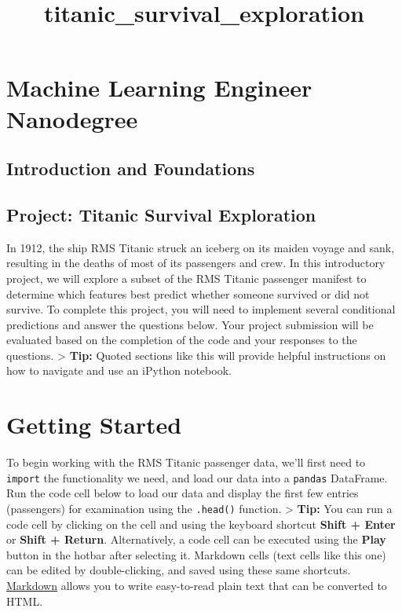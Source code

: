 \documentclass[11pt]{article}
\title{titanic\_survival\_exploration}
\begin{document}
    
    
    \maketitle
    
    

    
    \hypertarget{machine-learning-engineer-nanodegree}{%
\section{Machine Learning Engineer
Nanodegree}\label{machine-learning-engineer-nanodegree}}

\hypertarget{introduction-and-foundations}{%
\subsection{Introduction and
Foundations}\label{introduction-and-foundations}}

\hypertarget{project-titanic-survival-exploration}{%
\subsection{Project: Titanic Survival
Exploration}\label{project-titanic-survival-exploration}}

In 1912, the ship RMS Titanic struck an iceberg on its maiden voyage and
sank, resulting in the deaths of most of its passengers and crew. In
this introductory project, we will explore a subset of the RMS Titanic
passenger manifest to determine which features best predict whether
someone survived or did not survive. To complete this project, you will
need to implement several conditional predictions and answer the
questions below. Your project submission will be evaluated based on the
completion of the code and your responses to the questions.
\textgreater{} \textbf{Tip:} Quoted sections like this will provide
helpful instructions on how to navigate and use an iPython notebook.

    \hypertarget{getting-started}{%
\section{Getting Started}\label{getting-started}}

To begin working with the RMS Titanic passenger data, we'll first need
to \texttt{import} the functionality we need, and load our data into a
\texttt{pandas} DataFrame.\\
Run the code cell below to load our data and display the first few
entries (passengers) for examination using the \texttt{.head()}
function. \textgreater{} \textbf{Tip:} You can run a code cell by
clicking on the cell and using the keyboard shortcut \textbf{Shift +
Enter} or \textbf{Shift + Return}. Alternatively, a code cell can be
executed using the \textbf{Play} button in the hotbar after selecting
it. Markdown cells (text cells like this one) can be edited by
double-clicking, and saved using these same shortcuts.
\href{http://daringfireball.net/projects/markdown/syntax}{Markdown}
allows you to write easy-to-read plain text that can be converted to
HTML.
\end{document}
